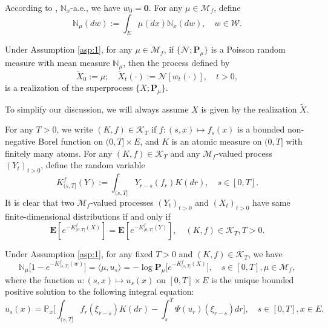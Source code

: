 	According to \cite[Theorem 8.22]{Li2011Measure-valued}, $\mathbb N_x$-a.e., we have $w_0 = \mathbf 0$.
	For any $\mu \in \mathcal M_f$, define
\[
	\mathbb N_\mu(dw)
	:=\int_E \mu(dx)\mathbb N_x(dw),
	\quad w\in \mathcal W.
\]	
\begin{lem}\label{lem:lislem}
	Under Assumption \ref{asp:1}, for any $\mu\in \mathcal M_f$,
	if $\{\mathcal N; \mathbf P_\mu\}$ is a Poisson random measure with mean measure $\mathbb N_\mu$,
	then the process defined by
\[
	\widetilde X_0 := \mu;
	\quad \widetilde X_t(\cdot)
	:=\mathcal N[w_t(\cdot)],
	\quad t>0,
\]
	is a realization of the superprocess $\{X; \mathbf P_{\mu}\}$.
\end{lem}
	To simplify our discussion, we will always assume $X$ is given by the realization $\widetilde X$.
\par
	For any $T>0$, we write $(K,f)\in \mathcal K_T$ if $f: (s,x) \mapsto f_s(x)$ is a bounded non-negative Borel function on $(0,T] \times E$, and $K$ is an atomic measure on $(0,T]$ with finitely many atoms.
	For any $(K,f)\in\mathcal K_T$ and any $\mathcal M_f$-valued  process $(Y_t)_{t> 0}$, define the random variable
\[	
	K_{(s, T]}^f(Y)
	:= \int_{(s,T]} Y_{r-s}(f_r) K(dr),
	\quad s\in [0,T].
\]	
	It is clear that two $\mathcal M_f$-valued processes $(Y_t)_{t>0}$ and $(X_t)_{t>0}$ have same finite-dimensional distributions if and only if
\[
	\mathbf E[e^{-K_{(0,T]}^f(X)}]
	=\mathbf E[e^{-K^f_{(0,T]}(Y)}],
	\quad (K,f)\in \mathcal K_T, T>0.
\]
\begin{lem}\label{lem:EquatDescNmeas}
	Under Assumption \ref{asp:1}, for any fixed $T> 0$ and $(K,f) \in \mathcal K_T$, we have
\[
	\mathbb N_\mu \big[ 1 - e^{-K_{(s, T]}^f(w)} \big]
	= \langle \mu, u_s \rangle
	= -\log \mathbf P_{\mu} \big[ e^{-K_{(s, T]}^f(X)} \big],
	\quad s\in [0,T], \mu \in \mathcal M_f,
\]
	where the function $u: (s,x) \mapsto u_s(x)$ on $[0,T] \times E$ is the unique bounded positive solution to the following integral equation:
\[
	u_s(x)
    =\mathbb P_x \Big[\int_{(s,T]} f_r(\xi_{r-s}) K(dr) - \int_s^T \Psi(u_r)(\xi_{r-s}) dr \Big],
    \quad s \in [0,T], x \in E.
\]
\end{lem}

